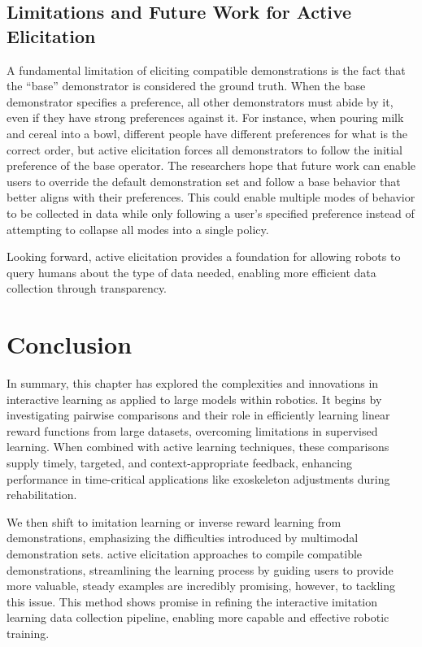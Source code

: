 \documentclass[
  letterpaper,
  DIV=11,
  numbers=noendperiod,
  oneside]{scrreprt}
\theoremstyle{remark}
\begin{document}
\subsection{Limitations and Future Work for Active
Elicitation}\label{limitations-and-future-work-for-active-elicitation}

A fundamental limitation of eliciting compatible demonstrations is the
fact that the ``base'' demonstrator is considered the ground truth. When
the base demonstrator specifies a preference, all other demonstrators
must abide by it, even if they have strong preferences against it. For
instance, when pouring milk and cereal into a bowl, different people
have different preferences for what is the correct order, but active
elicitation forces all demonstrators to follow the initial preference of
the base operator. The researchers hope that future work can enable
users to override the default demonstration set and follow a base
behavior that better aligns with their preferences. This could enable
multiple modes of behavior to be collected in data while only following
a user's specified preference instead of attempting to collapse all
modes into a single policy.

Looking forward, active elicitation provides a foundation for allowing
robots to query humans about the type of data needed, enabling more
efficient data collection through transparency.

\section{Conclusion}\label{conclusion-1}

In summary, this chapter has explored the complexities and innovations
in interactive learning as applied to large models within robotics. It
begins by investigating pairwise comparisons and their role in
efficiently learning linear reward functions from large datasets,
overcoming limitations in supervised learning. When combined with active
learning techniques, these comparisons supply timely, targeted, and
context-appropriate feedback, enhancing performance in time-critical
applications like exoskeleton adjustments during rehabilitation.

We then shift to imitation learning or inverse reward learning from
demonstrations, emphasizing the difficulties introduced by multimodal
demonstration sets. active elicitation approaches to compile compatible
demonstrations, streamlining the learning process by guiding users to
provide more valuable, steady examples are incredibly promising,
however, to tackling this issue. This method shows promise in refining
the interactive imitation learning data collection pipeline, enabling
more capable and effective robotic training.
\end{document}
